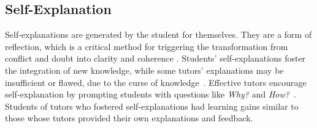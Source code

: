\subsection{Self-Explanation}

Self-explanations are generated by the student for themselves. They are a form of reflection, which is a critical method for triggering the transformation from conflict and doubt into clarity and coherence \cite{dewey1933}. Students' self-explanations foster the integration of new knowledge, while some tutors' explanations may be insufficient or flawed, due to the curse of knowledge~\cite{birch2007curse}. Effective tutors encourage self-explanation by prompting students with questions like {\it Why?} and {\it How?}~\cite{selfexplanation}. Students of tutors who fostered self-explanations had learning gains similar to those whose tutors provided their own explanations and feedback\cite{chi2001learning}. 




\begin{comment}
Turns et al. \cite{asee} argue that the absence of reflection in traditional engineering education is a significant shortcoming.
\end{comment}




